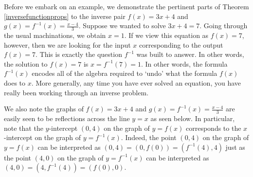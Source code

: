 \documentclass{ximera}
\begin{document}
Before we embark on an example, we demonstrate the pertinent parts of Theorem \ref{inversefunctionprops}  to the inverse pair $f(x) = 3x+4$ and $g(x) = f^{-1}(x) =  \frac{x-4}{3}$.  Suppose we wanted to solve $3x+4 = 7$.  Going through the usual machinations, we obtain $x = 1$.  
If we view this equation as $f(x) = 7$, however, then we are looking for the input $x$  corresponding to the output $f(x) = 7$.  This is exactly the question $f^{-1}$ was built to answer.  In other words, the solution to  $f(x) = 7$ is  $x = f^{-1}(7) =1$. In other words, the formula $f^{-1}(x)$ encodes all of the algebra required to `undo' what the formula $f(x)$ does to $x$.   More generally,  any time you have ever solved an equation, you have really been working through an inverse problem.

We also note the graphs of   $f(x) = 3x+4$ and $g(x) = f^{-1}(x) = \frac{x-4}{3}$ are easily seen to be reflections across the line $y=x$ as seen below.  In particular, note that the $y$-intercept $(0,4)$ on the graph of $y = f(x)$ corresponds to the $x$-intercept on the graph of $y = f^{-1}(x)$.  Indeed, the point $(0,4)$ on the graph of $y = f(x)$ can be interpreted as $(0,4) = (0,f(0)) = (f^{-1}(4), 4)$ just as the point $(4,0)$ on the graph of $y = f^{-1}(x)$ can be interpreted as $(4,0) = (4, f^{-1}(4)) = (f(0), 0)$.

\begin{image}
\end{image}
\end{document}
